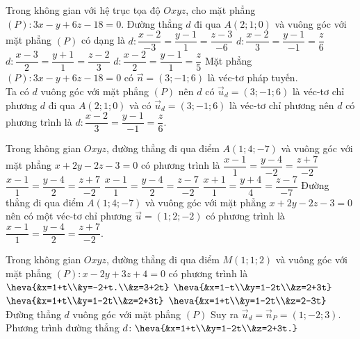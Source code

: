 \begin{ex}%
	Trong không gian với hệ trục tọa độ $O x y z$, cho mặt phẳng $(P)\colon 3x-y+6z-18=0$. Đường thẳng $d$ đi qua $A(2;1;0)$ và vuông góc với mặt phẳng $(P)$ có dạng là 
	\choice 
	{$d\colon\dfrac{x-2}{-3}=\dfrac{y-1}{1}=\dfrac{z-3}{-6}$}
	{\True $d\colon\dfrac{x-2}{3}=\dfrac{y-1}{-1}=\dfrac{z}{6}$}
	{$d\colon\dfrac{x-3}{2}=\dfrac{y+1}{1}=\dfrac{z-2}{3}$}
	{$d\colon\dfrac{x-2}{2}=\dfrac{y-1}{1}=\dfrac{z}{5}$}
	\loigiai 
	{
Mặt phẳng $(P)\colon 3x-y+6z-18=0$ có $\vec{n}=(3;-1;6)$ là véc-tơ pháp tuyến.\\
Ta có $d$ vuông góc với mặt phẳng $(P)$ nên $d$ có $\vec{u}_d=(3;-1;6)$ là véc-tơ chỉ phương $d$ đi qua $A(2;1;0)$ và có $\vec{u}_d=(3;-1;6)$ là véc-tơ chỉ phương nên $d$ có phương trình là $d\colon \dfrac{x-2}{3}=\dfrac{y-1}{-1}=\dfrac{z}{6}$.
	}
\end{ex}

\begin{ex}%
	Trong không gian $O x y z$, đường thẳng đi qua điểm $A(1;4;-7)$ và vuông góc với mặt phẳng $x+2y-2z-3=0$ có phương trình là 
	\choice 
	{$\dfrac{x-1}{1}=\dfrac{y-4}{-2}=\dfrac{z+7}{-2}$}
	{\True $\dfrac{x-1}{1}=\dfrac{y-4}{2}=\dfrac{z+7}{-2}$}
	{$\dfrac{x-1}{1}=\dfrac{y-4}{2}=\dfrac{z-7}{-2}$}
	{$\dfrac{x+1}{1}=\dfrac{y+4}{4}=\dfrac{z-7}{-7}$}
	\loigiai 
	{
Đường thẳng đi qua điểm $A(1;4;-7)$ và vuông góc với mặt phẳng $x+2y-2z-3=0$ nên có một véc-tơ chỉ phương $\vec{u}=(1;2;-2)$ có phương trình là $\dfrac{x-1}{1}=\dfrac{y-4}{2}=\dfrac{z+7}{-2}$.
	}
\end{ex}

\begin{ex}%
	Trong không gian $O x y z$, đường thẳng đi qua điểm $M(1;1;2)$ và vuông góc với mặt phẳng $(P)\colon x-2y+3z+4=0$ có phương trình là 
	\choice 
	{$\heva{&x=1+t\\&y=-2+t.\\&z=3+2t}$}
		{$\heva{&x=1-t\\&y=1-2t\\&z=2+3t}$}
			{\True $\heva{&x=1+t\\&y=1-2t\\&z=2+3t}$}
				{$\heva{&x=1+t\\&y=1-2t\\&z=2-3t}$}
					\loigiai 
					{
	Đường thẳng $d$ vuông góc với mặt phẳng $(P)$ Suy ra $\vec{u}_d=\vec{n}_P=(1;-2;3)$.\\
	Phương trình đường thẳng $d\colon \heva{&x=1+t\\&y=1-2t\\&z=2+3t.}$
					}
				\end{ex}
	
